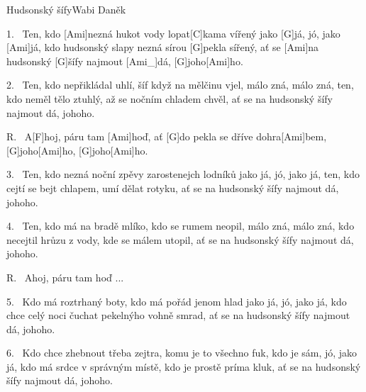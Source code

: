 \begin{song}{Hudsonský šífy}{Wabi Daněk}

\begin{xverse}{1.~}
Ten, kdo [Ami]nezná hukot vody lopat[C]kama vířený
jako [G]já, jó, jako [Ami]já,
kdo hudsonský slapy nezná sírou [G]pekla sířený,
ať se [Ami]na hudsonský [G]{}šífy najmout [Ami_]{dá}, [G]joho[Ami]ho.
\end{xverse}

\begin{xverse}{2.~}
Ten, kdo nepřikládal uhlí, šíf když na mělčinu vjel,
málo zná, málo zná,
ten, kdo neměl tělo ztuhlý, až se nočním chladem chvěl,
ať se na hudsonský šífy najmout dá, johoho.
\end{xverse}

\begin{xverse}{R.~}
A[F]hoj, páru tam [Ami]hoď,
ať [G]do pekla se dříve dohra[Ami]bem,
[G]joho[Ami]ho,  [G]joho[Ami]ho.
\end{xverse}

\begin{xverse}{3.~}
Ten, kdo nezná noční zpěvy zarostenejch lodníků
jako já, jó, jako já,
ten, kdo cejtí se bejt chlapem, umí dělat rotyku,
ať se na hudsonský šífy najmout dá, johoho.
\end{xverse}

\begin{xverse}{4.~}
Ten, kdo má na bradě mlíko, kdo se rumem neopil,
málo zná, málo zná,
kdo necejtil hrůzu z vody, kde se málem utopil,
ať se na hudsonský šífy najmout dá, johoho.
\end{xverse}

\begin{xverse}{R.~}
Ahoj, páru tam hoď ...
\end{xverse}

\begin{xverse}{5.~}
Kdo má roztrhaný boty, kdo má pořád jenom hlad
jako já, jó, jako já,
kdo chce celý noci čuchat pekelnýho vohně smrad,
ať se na hudsonský šífy najmout dá, johoho.
\end{xverse}

\begin{xverse}{6.~}
Kdo chce zhebnout třeba zejtra, komu je to všechno fuk,
kdo je sám, jó, jako já,
kdo má srdce v správným místě, kdo je prostě príma kluk,
ať se na hudsonský šífy najmout dá, johoho.
\end{xverse}

\end{song}

